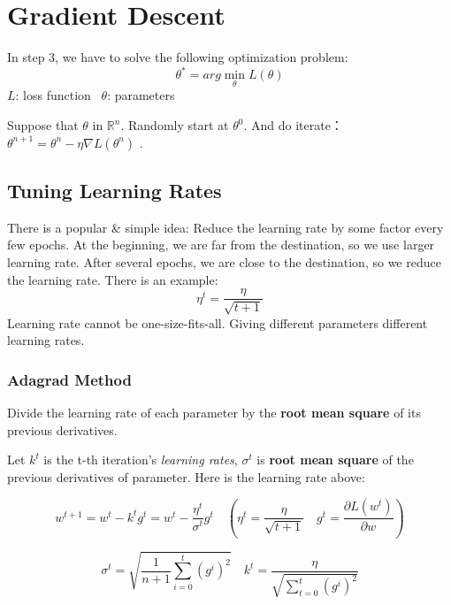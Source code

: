 \documentclass{article}
\newenvironment{propblock}[1][\textbf{Proposition}]{\begin{tcolorbox}
[title = \textbf{#1}, colback=Salmon!20, colframe=Salmon!90!Black]}{\end{tcolorbox}}
\newenvironment{colblock}[1][\textbf{Collary}]{\begin{tcolorbox}[colback=JungleGreen!10!Cerulean!15,colframe=CornflowerBlue!60!Black,title = \textbf{#1}]}{\end{tcolorbox}}
\begin{document}
\section{Gradient Descent}

In step 3, we have to solve the following optimization problem:
$$
\theta ^* = arg \min_\theta L(\theta) 
$$
$L$: loss function \ $\theta$: parameters

Suppose that $\theta$ in $\mathbb{R} ^ n$. Randomly start at $\theta^0$. And do iterate：$\theta^{n+1} = \theta^n - \eta \nabla L(\theta^n)$ .

\subsection{Tuning Learning Rates}

There is a popular \& simple idea: Reduce the learning rate by some factor every few epochs. At the beginning, we are far from the destination, so we use larger learning rate. After several epochs, we are close to the destination, so we reduce the learning rate. There is an example:
$$
\eta ^ t = \frac{\eta}{\sqrt{t + 1}}
$$
Learning rate cannot be one-size-fits-all. Giving different parameters different learning rates.

\subsubsection{Adagrad Method}

\begin{colblock}[Definition of Adagrad Method]
    Divide the learning rate of each parameter by the \textbf{root mean square} of its previous derivatives.
\end{colblock}

\begin{propblock}[How To Use Adagrad]
    Let $k^t$ is the t-th iteration's \textit{learning rates}, $\sigma^t$ is \textbf{root mean square} of the previous derivatives of parameter. Here is the learning rate above:
    
    $$
    w^{t+1} = w^t - k^tg^t= w^t - \frac{\eta^t}{\sigma^t}g^t\quad (\eta^t = \frac{\eta}{\sqrt{t+1}}\quad g^{t}=\frac{\partial L\left(w^{t}\right)}{\partial w})
    $$

    $$
    \sigma^t = \sqrt{\frac{1}{n+1}\sum_{i=0}^t(g^i)^2}\quad k^t = \frac{\eta}{\sqrt{\sum_{t=0}^{t}(g^i)^2}}
    $$
    
\end{propblock}
\end{document}

